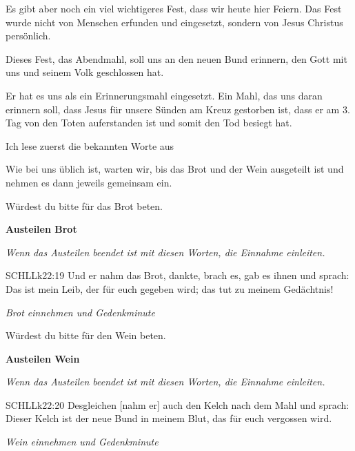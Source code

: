 \documentclass[fontsize=16pt]{mybib}
\begin{document}
Es gibt aber noch ein viel wichtigeres Fest, dass wir heute hier Feiern. Das Fest wurde nicht von Menschen erfunden und eingesetzt, sondern von Jesus Christus persönlich.

Dieses Fest, das Abendmahl, soll uns an den neuen Bund erinnern, den Gott mit uns und seinem Volk geschlossen hat.

Er hat es uns als ein Erinnerungsmahl eingesetzt. Ein Mahl, das uns daran erinnern soll, dass Jesus für unsere Sünden am Kreuz gestorben ist, dass er am 3. Tag von den Toten auferstanden ist und somit den Tod besiegt hat.

Ich lese zuerst die bekannten Worte aus

Wie bei uns üblich ist, warten wir, bis das Brot und der Wein ausgeteilt ist und nehmen es dann jeweils gemeinsam ein.

Würdest du bitte für das Brot beten.


{\textbf{Austeilen Brot}}

\textit{Wenn das Austeilen beendet ist mit diesen Worten, die Einnahme einleiten. }
\begin{bibelbox}{SCHL}{Lk}{22:19}
Und er nahm das Brot, dankte, brach es, gab es ihnen und sprach: Das ist mein Leib, der für euch gegeben wird; das tut zu meinem Gedächtnis!
\end{bibelbox}

\textit{Brot einnehmen und Gedenkminute}


Würdest du bitte für den Wein beten. 


{\textbf{Austeilen Wein}}

\textit{Wenn das Austeilen beendet ist mit diesen Worten, die Einnahme einleiten. }
\begin{bibelbox}{SCHL}{Lk}{22:20}
Desgleichen [nahm er] auch den Kelch nach dem Mahl und sprach: Dieser Kelch ist der neue Bund in meinem Blut, das für euch vergossen wird.
\end{bibelbox}

\textit{Wein einnehmen und Gedenkminute}

%
\end{document}
